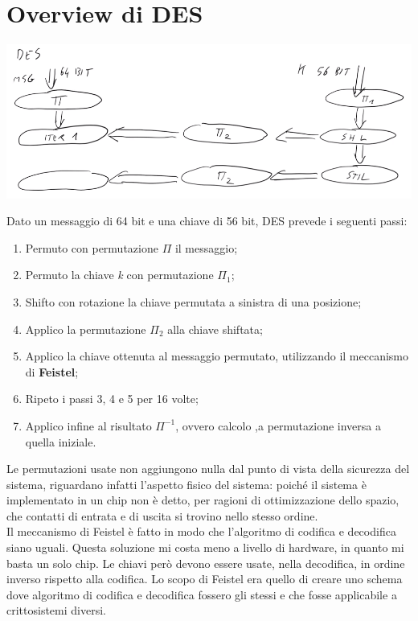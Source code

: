 \section{Overview di DES}

\begin{center}
    \includegraphics[width=1\textwidth]{images/2.png}
\end{center}

Dato un messaggio di 64 bit e una chiave di 56 bit, DES prevede i seguenti passi:

\begin{enumerate}
    \item Permuto con permutazione $\Pi$ il messaggio;
    \item Permuto la chiave \textit{k} con permutazione $\Pi_1$;
    \item Shifto con rotazione la chiave permutata a sinistra di una posizione;
    \item Applico la permutazione $\Pi_2$ alla chiave shiftata;
    \item Applico la chiave ottenuta al messaggio permutato, utilizzando il meccanismo di \textbf{Feistel};
    \item Ripeto i passi 3, 4 e 5 per 16 volte;
    \item Applico infine al risultato $\Pi^{-1}$, ovvero calcolo ,a permutazione inversa a quella iniziale.
\end{enumerate}

\noindent Le permutazioni usate non aggiungono nulla dal punto di vista della sicurezza del sistema, riguardano infatti l'aspetto fisico del sistema: poiché il sistema è implementato in un chip non è detto, per ragioni di ottimizzazione dello spazio, che contatti di entrata e di uscita si trovino nello stesso ordine.
\\

\noindent Il meccanismo di Feistel è fatto in modo che l'algoritmo di codifica e decodifica siano uguali. Questa soluzione mi costa meno a livello di hardware, in quanto mi basta un solo chip. Le chiavi però devono essere usate, nella decodifica, in ordine inverso rispetto alla codifica. Lo scopo di Feistel era quello di creare uno schema dove algoritmo di codifica e decodifica fossero gli stessi e che fosse applicabile a crittosistemi diversi.

